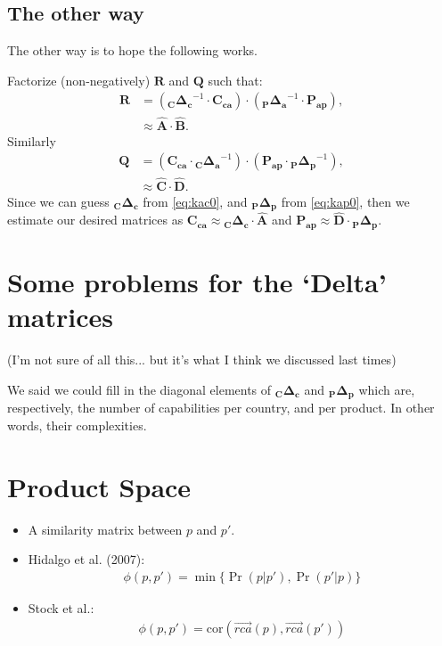 \documentclass[12pt]{article}
\newcommand{\mtx}[1]{\mathbf{ #1}}
\begin{document}
\subsection{The other way}
The other way is to hope the following works. 

Factorize (non-negatively) $\mtx{R}$ and $\mtx{Q}$ such that:
\begin{align}
	\mtx{R}&=\left( \mtx{{}_C\Delta_c}^{-1}\cdot\mtx{C_{ca}} \right)\cdot\left( \mtx{{}_P\Delta_a}^{-1}\cdot\mtx{P_{ap}} \right),\nonumber\\
	&\approx\mtx{\hat{A}}\cdot\mtx{\hat{B}}.
\end{align}
Similarly
\begin{align}
	\mtx{Q}&=\left( \mtx{C_{ca}}\cdot \mtx{{}_C\Delta_a}^{-1} \right)\cdot\left( \mtx{P_{ap}}\cdot \mtx{{}_P\Delta_p}^{-1} \right),\nonumber\\
	&\approx\mtx{\hat{C}}\cdot\mtx{\hat{D}}.
\end{align}
Since we can guess $\mtx{{}_C\Delta_c}$ from \cref{eq:kac0}, and $\mtx{{}_P\Delta_p}$ from \cref{eq:kap0}, then we estimate our desired matrices as $\mtx{C_{ca}}\approx \mtx{{}_C\Delta_c}\cdot\mtx{\hat{A}}$ and $\mtx{P_{ap}}\approx \mtx{\hat{D}}\cdot\mtx{{}_P\Delta_p}$.

\section{Some problems for the `Delta' matrices}
(I'm not sure of all this... but it's what I think we discussed last times)

We said we could fill in the diagonal elements of $\mtx{{}_C\Delta_c}$ and $\mtx{{}_P\Delta_p}$ which are, respectively, the number of capabilities per country, and per product. In other words, their complexities.

\newpage
\section{Product Space}
\begin{itemize}
	\item A similarity matrix between $p$ and $p'$.
	\item Hidalgo et al. (2007):
	\begin{align}
		\phi(p, p') = \min\{ \Pr(p|p'), \Pr(p'|p) \}
	\end{align}
	\item Stock et al.:
	\begin{align}
		\phi(p, p') = \mathrm{cor}( \vec{rca}(p), \vec{rca}(p') )
	\end{align}
\end{itemize}
\end{document}
